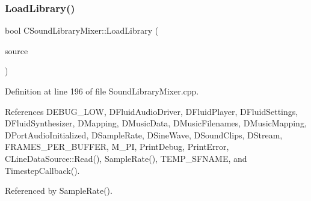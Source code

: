 \subsubsection{\texorpdfstring{Load\+Library()}{LoadLibrary()}}
{\footnotesize\ttfamily bool C\+Sound\+Library\+Mixer\+::\+Load\+Library (\begin{DoxyParamCaption}\item[{std\+::shared\+\_\+ptr$<$ \hyperlink{classCDataSource}{C\+Data\+Source} $>$}]{source }\end{DoxyParamCaption})}



Definition at line 196 of file Sound\+Library\+Mixer.\+cpp.



References D\+E\+B\+U\+G\+\_\+\+L\+OW, D\+Fluid\+Audio\+Driver, D\+Fluid\+Player, D\+Fluid\+Settings, D\+Fluid\+Synthesizer, D\+Mapping, D\+Music\+Data, D\+Music\+Filenames, D\+Music\+Mapping, D\+Port\+Audio\+Initialized, D\+Sample\+Rate, D\+Sine\+Wave, D\+Sound\+Clips, D\+Stream, F\+R\+A\+M\+E\+S\+\_\+\+P\+E\+R\+\_\+\+B\+U\+F\+F\+ER, M\+\_\+\+PI, Print\+Debug, Print\+Error, C\+Line\+Data\+Source\+::\+Read(), Sample\+Rate(), T\+E\+M\+P\+\_\+\+S\+F\+N\+A\+ME, and Timestep\+Callback().



Referenced by Sample\+Rate().


